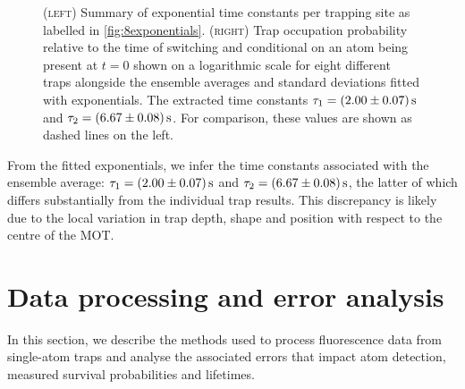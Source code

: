 \documentclass[../Thesis-IJspeert.tex]{subfiles}
\begin{document}
\begin{figure}[!t]
	\caption[Exponential time constants per trapping site and ensemble survival probabilities associated with passive modulation of trap depth]{\textsc{(left)} Summary of exponential time constants per trapping site as labelled in \autoref{fig:8exponentials}. \textsc{(right)} Trap occupation probability relative to the time of switching and conditional on an atom being present at $t=0$ shown on a logarithmic scale for eight different traps alongside the ensemble averages and standard deviations fitted with exponentials. The extracted time constants $\tau_1=\SI{2.00\pm0.07}{\second}$ and $\tau_2=\SI{6.67\pm0.08}{\second}$. For comparison, these values are shown as dashed lines on the left.}
	\label{ensemblepassive} 
\end{figure}
From the fitted exponentials, we infer the time constants associated with the ensemble average: $\tau_1=\SI{2.00\pm0.07}{\second}$ and $\tau_2=\SI{6.67\pm0.08}{\second}$, the latter of which differs substantially from the individual trap results. This discrepancy is likely due to the local variation in trap depth, shape and position with respect to the centre of the MOT.

\section{Data processing and error analysis}
\label{erroranalysis}
In this section, we describe the methods used to process fluorescence data from single-atom traps and analyse the associated errors that impact atom detection, measured survival probabilities and lifetimes.
\end{document}
